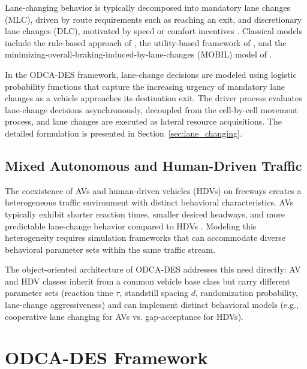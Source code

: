 \documentclass[review,authoryear]{elsarticle}
\begin{document}
Lane-changing behavior is typically decomposed into mandatory lane changes (MLC), driven by route requirements such as reaching an exit, and discretionary lane changes (DLC), motivated by speed or comfort incentives \citep{zheng2014recent}. Classical models include the rule-based approach of \citet{gipps1986model}, the utility-based framework of \citet{toledo2003modeling}, and the minimizing-overall-braking-induced-by-lane-changes (MOBIL) model of \citet{kesting2007general}.

In the ODCA-DES framework, lane-change decisions are modeled using logistic probability functions that capture the increasing urgency of mandatory lane changes as a vehicle approaches its destination exit. The driver process evaluates lane-change decisions asynchronously, decoupled from the cell-by-cell movement process, and lane changes are executed as lateral resource acquisitions. The detailed formulation is presented in Section~\ref{sec:lane_changing}.

\subsection{Mixed Autonomous and Human-Driven Traffic}
\label{sec:lit_mixed}

The coexistence of AVs and human-driven vehicles (HDVs) on freeways creates a heterogeneous traffic environment with distinct behavioral characteristics. AVs typically exhibit shorter reaction times, smaller desired headways, and more predictable lane-change behavior compared to HDVs \citep{talebpour2016influence, shladover2012impacts, vanarem2006effects}. Modeling this heterogeneity requires simulation frameworks that can accommodate diverse behavioral parameter sets within the same traffic stream.

The object-oriented architecture of ODCA-DES addresses this need directly: AV and HDV classes inherit from a common vehicle base class but carry different parameter sets (reaction time $\tau$, standstill spacing $d$, randomization probability, lane-change aggressiveness) and can implement distinct behavioral models (e.g., cooperative lane changing for AVs vs. gap-acceptance for HDVs).


\section{ODCA-DES Framework}
\label{sec:framework}
\end{document}
